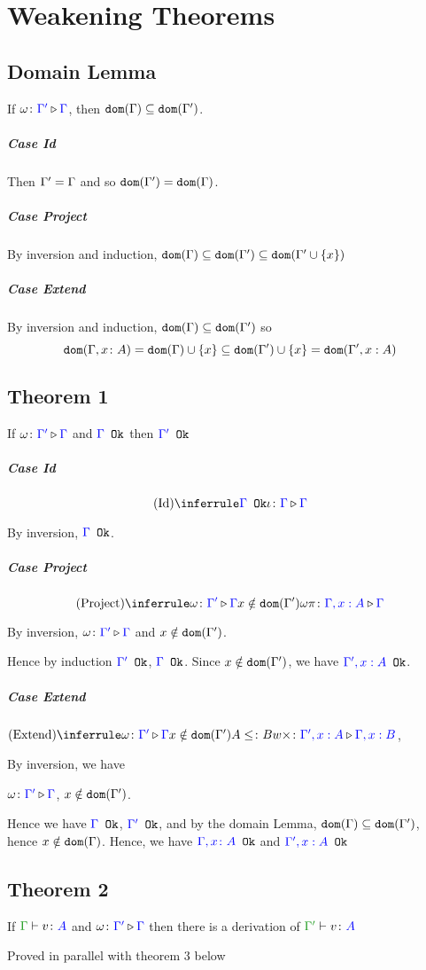\documentclass{report}
\begin{document}
\section{Weakening Theorems}
\subsection{Domain Lemma}
If $\wrel{\w}{\G'}{\G}$, then $\dom{\G}\subseteq \dom{\G'}$.

\proof
\subparagraph{Case Id}
Then $\G' = \G$ and so $\dom{\G'} = \dom{\G}$.
\subparagraph{Case Project}
By inversion and induction, $\dom{\G}\subseteq\dom{\G'}\subseteq\dom{\G'\cup\left\{x\right\}}$
\subparagraph{Case Extend}
By inversion and induction, $\dom{\G}\subseteq\dom{\G'}$ so 
$$\dom{\gax} = \dom{\G}\cup\left\{x\right\} \subseteq\dom{\G'}\cup\left\{x\right\} = \dom{\G',x:A}$$
\subsection{Theorem 1}
If $\wrel{\w}{\G'}{\G}$ and $\ok{\G}$ then $\ok{\G'}$
\proof
\subparagraph{Case Id}
$$\ntreeruleI{Id}{\ok{\G}}{\wrel{\i}{\G}{\G}}$$

By inversion, $\ok{\G}$.

\subparagraph{Case Project}
$$\ntreeruleII{Project}{\wrel{\w}{\G'}{\G}}{ x \notin \dom{\G'}}{\wrel{\w \pi}{\G, x: A}{\G}}$$

By inversion, $\wrel{\w}{\G'}{\G}$ and $x\notin \dom{\G'}$.

Hence by induction $\ok{\G'}$, $\ok{\G}$. Since $x\notin\dom{\G'}$, we have $\ok{\G', x:A}$.

\subparagraph{Case Extend}
$\ntreeruleIII{Extend}{\wrel{\w}{\G'}{\G}}{ x \notin \dom{\G'}}{ A \subtype B}{\wrel{w \x}{\G', x: A}{\G, x: B}}$, 

By inversion, we have 

$\wrel{\w}{\G'}{\G}$, $x\notin\dom{\G'}$.

Hence we have $\ok{\G}$, $\ok{\G'}$, and by the domain Lemma, $\dom{\G}\subseteq\dom{\G'}$, hence $x\notin\dom{\G}$. Hence, we have $\ok{\gax}$ and $\ok{\G',x:A}$


\subsection{Theorem 2}
If $\gtyperelation{v}{A}$ and $\wrel{\w}{\G'}{\G}$ then there is a derivation of $\typerelation{\G'}{v}{A}$

\proof
Proved in parallel with theorem 3 below
\end{document}
